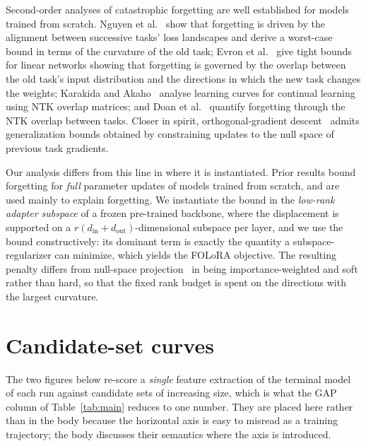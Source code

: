 Second-order analyses of catastrophic forgetting are well established for models trained
from scratch. Nguyen et al.~\cite{nguyen2019toward} show that forgetting is driven by the
alignment between successive tasks' loss landscapes and derive a worst-case bound in terms
of the curvature of the old task; Evron et al.~\cite{evron2022catastrophic} give tight
bounds for linear networks showing that forgetting is governed by the overlap between the
old task's input distribution and the directions in which the new task changes the weights;
Karakida and Akaho~\cite{karakida2022learning} analyse learning curves for continual
learning using NTK overlap matrices; and Doan et al.~\cite{doan2021theoretical} quantify
forgetting through the NTK overlap between tasks. Closer in spirit, orthogonal-gradient
descent~\cite{bennani2019generalisation,farajtabar2020orthogonal} admits generalization
bounds obtained by constraining updates to the null space of previous task gradients.

Our analysis differs from this line in where it is instantiated. Prior results bound
forgetting for \emph{full} parameter updates of models trained from scratch, and are used
mainly to explain forgetting. We instantiate the bound in the \emph{low-rank adapter
subspace} of a frozen pre-trained backbone, where the displacement is supported on a
$r(d_{\text{in}}\!+\!d_{\text{out}})$-dimensional subspace per layer, and we use the bound
constructively: its dominant term is exactly the quantity a subspace-regularizer can
minimize, which yields the FOLoRA objective. The resulting penalty differs from
null-space projection~\cite{saha2021gradient,bennani2019generalisation} in being
importance-weighted and soft rather than hard, so that the fixed rank budget is spent on
the directions with the largest curvature.

\section{Candidate-set curves}
\label{app:curves}

The two figures below re-score a \emph{single} feature extraction of the terminal model of
each run against candidate sets of increasing size, which is what the GAP column of
Table~\ref{tab:main} reduces to one number. They are placed here rather than in the body
because the horizontal axis is easy to misread as a training trajectory; the body discusses
their semantics where the axis is introduced.




